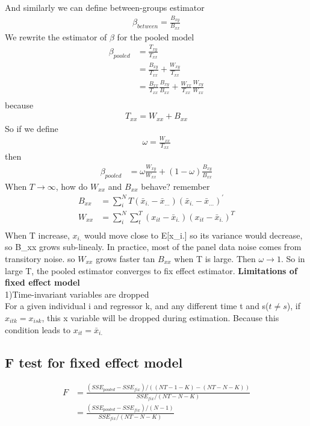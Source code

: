 \documentclass[a4paper]{article}
\begin{document}
And similarly we can define between-groups estimator
\begin{align*}
\beta_{between} = \frac{B_{xy}}{B_{xx}}
\end{align*}
We rewrite the  estimator of $\beta$ for the pooled model 
\begin{align*}
\beta_{pooled} & = \frac{T_{xy}}{T_{xx}} \\
                      & = \frac{B_{xy}}{T_{xx}} + \frac{W_{xy}}{T_{xx}}\\
                      & = \frac{B_{xx}}{T_{xx}}\frac{B_{xy}}{B_{xx}}  +  \frac{W_{xx}}{T_{xx}} \frac{W_{xy}}{W_{xx}} \\
\end{align*}
because
\begin{align*}
T_{xx} = W_{xx} + B_{xx}
\end{align*}
So if we define 
\begin{align*}
\omega = \frac{W_{xx}}{T_{xx}}
\end{align*}
then 
\begin{align*}
\beta_{pooled} & = \omega \frac{W_{xy}}{W_{xx}}+ (1 - \omega) \frac {B_{xy}}{B_{xx}} 
\end{align*}
When $T \rightarrow \infty$, how do $W_{xx}$ and $B_{xx}$ behave? remember
\begin{align*}
B_{xx} & = \sum_i^NT(\bar x_{i.}-\bar x_{...})(\bar x_{i.}-\bar x_{...})^{'} \\
W_{xx} &= \sum_i^N\sum_t^T(x_{it}-\bar x_{i.})(x_{it}- \bar x_{i.})^T\\
\end{align*} 
When T increase, $x_{i.}$ would move close to E[x_{i.}] so its variance would decrease, so B_{xx} grows sub-linealy. In practice, most of the panel data noise comes from transitory noise. so $W_{xx}$ grows faster tan $B_{xx}$ when T is large. Then $\omega \rightarrow 1$. So in large T, the pooled estimator converges to fix effect estimator.
{\bf Limitations of fixed effect model}\\
1)Time-invariant variables are dropped\\
For a given individual i and regressor k, and any different time t and s($t \neq s$), if $x_{itk}=x_{isk}$, this x variable will be dropped during estimation. Because this condition leads to $x_{it} = \bar x_{i.}$\\  
\subsection{F test for fixed effect model}
\begin{align*}
F & = \frac{(SSE_{pooled}-SSE_{fix})/((NT-1-K)-(NT-N-K))}{SSE_{fix}/(NT-N-K)} \\
&= \frac{(SSE_{pooled}-SSE_{fix})/(N-1)}{SSE_{fix}/(NT-N-K)}
\end{align*}
\end{document}
